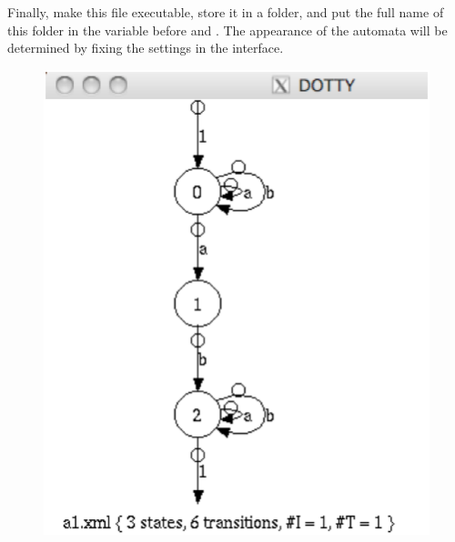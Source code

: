 Finally, make this file executable, store it in a folder, and put the
full name of this folder in the  variable before
 and .
The appearance of the automata will be determined by fixing the
settings in the interface.

\begin{figure}[ht]
    \centering
\includegraphics[scale=0.25]{figures/a1-dotty.ps}
\ee

\end{figure}
